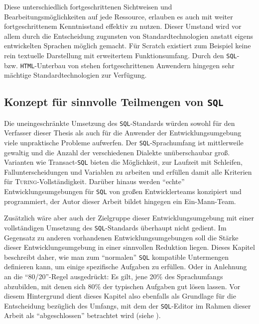 Diese unterschiedlich fortgeschrittenen Sichtweisen und Bearbeitungsmöglichkeiten auf jede Ressource, erlauben es \idename{} auch mit weiter fortgeschrittenem Kenntnisstand effektiv zu nutzen. Dieser Umstand wird vor allem durch die Entscheidung zugunsten von Standardtechnologien anstatt eigens entwickelten Sprachen möglich gemacht. Für Scratch existiert zum Beispiel keine rein textuelle Darstellung mit erweitertem Funktionsumfang. Durch den \texttt{SQL}- bzw. \texttt{HTML}-Unterbau von \idename{} stehen fortgeschrittenen Anwendern hingegen sehr mächtige Standardtechnologien zur Verfügung.

\subsection{Konzept für sinnvolle Teilmengen von \texttt{SQL}}
\label{sec:sql-subset}

Die uneingeschränkte Umsetzung des \texttt{SQL}-Standards würden sowohl für den Verfasser dieser Thesis als auch für die Anwender der Entwicklungsumgebung viele unpraktische Probleme aufwerfen. Der \texttt{SQL}-Sprachumfang ist mittlerweile gewaltig und die Anzahl der verschiedenen Dialekte unüberschaubar groß. Varianten wie Transact-\texttt{SQL} bieten die Möglichkeit, zur Laufzeit mit Schleifen, Fallunterscheidungen und Variablen zu arbeiten und erfüllen damit alle Kriterien für \textsc{Turing}-Vollständigkeit. Darüber hinaus werden "`echte"' Entwicklungsumgebungen für \texttt{SQL} von großen Entwicklerteams konzipiert und programmiert, der Autor dieser Arbeit bildet hingegen ein Ein-Mann-Team.


Zusätzlich wäre aber auch der Zielgruppe dieser Entwicklungsumgebung mit einer vollständigen Umsetzung des \texttt{SQL}-Standards überhaupt nicht gedient. Im Gegensatz zu anderen vorhandenen Entwicklungsumgebungen soll die Stärke dieser Entwicklungsumgebung in einer sinnvollen Reduktion liegen. Dieses Kapitel beschreibt daher, wie man zum "`normalen"' \texttt{SQL} kompatible Untermengen definieren kann, um einige spezifische Aufgaben zu erfüllen. Oder in Anlehnung an die "`80/20"'-Regel ausgedrückt: Es gilt, jene 20\% des Sprachumfangs abzubilden, mit denen sich 80\% der typischen Aufgaben gut lösen lassen. Vor diesem Hintergrund dient dieses Kapitel also ebenfalls als Grundlage für die Entscheidung bezüglich des Umfangs, mit dem der \texttt{SQL}-Editor im Rahmen dieser Arbeit als "`abgeschlossen"' betrachtet wird (siehe ).

